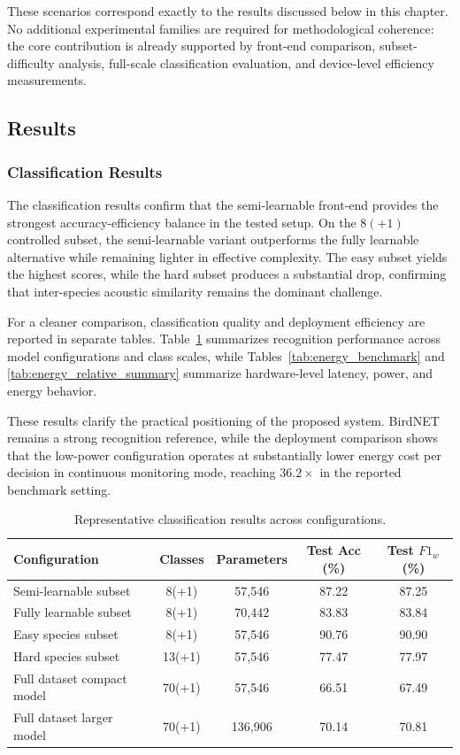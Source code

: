 \documentclass[a4paper,singleside,12pt]{report} %
\begin{document}
	These scenarios correspond exactly to the results discussed below in this chapter. No additional experimental families are required for methodological coherence: the core contribution is already supported by front-end comparison, subset-difficulty analysis, full-scale classification evaluation, and device-level efficiency measurements.

	\subsection{Results}
	\subsubsection{Classification Results}
	The classification results confirm that the semi-learnable front-end provides the strongest accuracy-efficiency balance in the tested setup. On the \(8(+1)\) controlled subset, the semi-learnable variant outperforms the fully learnable alternative while remaining lighter in effective complexity. The easy subset yields the highest scores, while the hard subset produces a substantial drop, confirming that inter-species acoustic similarity remains the dominant challenge.

	For a cleaner comparison, classification quality and deployment efficiency are reported in separate tables. Table~\ref{tab:extended_results} summarizes recognition performance across model configurations and class scales, while Tables~\ref{tab:energy_benchmark} and \ref{tab:energy_relative_summary} summarize hardware-level latency, power, and energy behavior.

	These results clarify the practical positioning of the proposed system. BirdNET remains a strong recognition reference, while the deployment comparison shows that the low-power configuration operates at substantially lower energy cost per decision in continuous monitoring mode, reaching \(36.2\times\) in the reported benchmark setting.

	\begin{table}[H]
		\centering
		\scriptsize
		\renewcommand{\arraystretch}{1.15}
		\setlength{\tabcolsep}{6pt}
		\caption{Representative classification results across configurations.}
		\label{tab:extended_results}
		\begin{tabular}{|l|c|c|c|c|}
			\hline
			Configuration & Classes & Parameters & Test Acc (\%) & Test \(F1_w\) (\%) \\
			\hline
			Semi-learnable subset & 8(+1) & 57,546 & 87.22 & 87.25 \\
			Fully learnable subset & 8(+1) & 70,442 & 83.83 & 83.84 \\
			Easy species subset & 8(+1) & 57,546 & 90.76 & 90.90 \\
			Hard species subset & 13(+1) & 57,546 & 77.47 & 77.97 \\
			Full dataset compact model & 70(+1) & 57,546 & 66.51 & 67.49 \\
			Full dataset larger model & 70(+1) & 136,906 & 70.14 & 70.81 \\
			\hline
		\end{tabular}
	\end{table}
\end{document}
